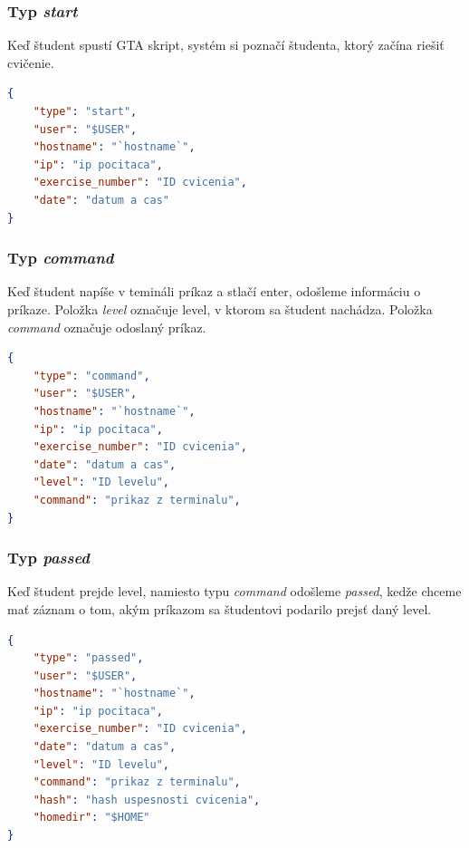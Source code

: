 \subsubsection{Typ \textit{start}}
\label{sec:zbieraniedat:start}

Keď študent spustí GTA skript, systém si poznačí študenta, ktorý začína riešiť cvičenie.

\begin{lstlisting}[language=json,firstnumber=1]
{
    "type": "start",
    "user": "$USER",
    "hostname": "`hostname`",
    "ip": "ip pocitaca",
    "exercise_number": "ID cvicenia",
    "date": "datum a cas"
}
\end{lstlisting}

\subsubsection{Typ \textit{command}}
\label{sec:zbieraniedat:gtadata:command}

Keď študent napíše v temináli príkaz a stlačí enter, odošleme informáciu o príkaze.
Položka \textit{level} označuje level, v ktorom sa študent nachádza. Položka
\textit{command} označuje odoslaný príkaz.

\begin{lstlisting}[language=json,firstnumber=1]
{
    "type": "command",
    "user": "$USER",
    "hostname": "`hostname`",
    "ip": "ip pocitaca",
    "exercise_number": "ID cvicenia",
    "date": "datum a cas",
    "level": "ID levelu",
    "command": "prikaz z terminalu",
}
\end{lstlisting}

\subsubsection{Typ \textit{passed}}
\label{sec:zbieraniedat:gtadata:passed}

Keď študent prejde level, namiesto typu \textit{command} odošleme \textit{passed},
kedže chceme mať záznam o tom, akým príkazom sa študentovi podarilo prejsť daný level.

\begin{lstlisting}[language=json,firstnumber=1]
{
    "type": "passed",
    "user": "$USER",
    "hostname": "`hostname`",
    "ip": "ip pocitaca",
    "exercise_number": "ID cvicenia",
    "date": "datum a cas",
    "level": "ID levelu",
    "command": "prikaz z terminalu",
    "hash": "hash uspesnosti cvicenia",
    "homedir": "$HOME"
}
\end{lstlisting}

